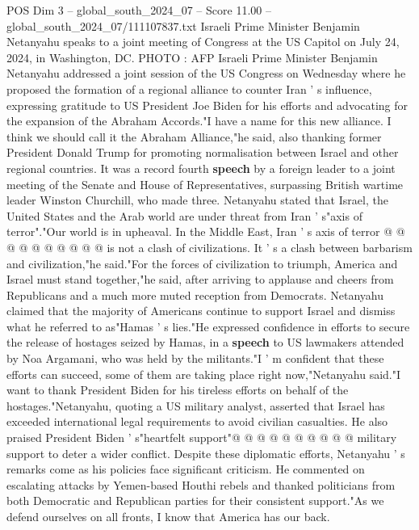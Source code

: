 \begin{textsample}{POS Dim 3 – global\_south\_2024\_07 – Score 11.00 – global\_south\_2024\_07/111107837.txt}  \label{ex:f3_pos_310}
Israeli Prime Minister Benjamin Netanyahu speaks to a joint meeting of Congress at the US Capitol on July 24, 2024, in Washington, DC.
PHOTO : AFP Israeli Prime Minister Benjamin Netanyahu addressed a joint session of the US Congress on Wednesday where he proposed the formation of a regional alliance to counter Iran ' s influence, expressing gratitude to US President Joe Biden for his efforts and advocating for the expansion of the Abraham Accords."I have a name for this new alliance.
I think we should call it the Abraham Alliance,"he said, also thanking former President Donald Trump for promoting normalisation between Israel and other regional countries.
It was a record fourth \textbf{speech} by a foreign leader to a joint meeting of the Senate and House of Representatives, surpassing British wartime leader Winston Churchill, who made three.
Netanyahu stated that Israel, the United States and the Arab world are under threat from Iran ' s"axis of terror"."Our world is in upheaval.
In the Middle East, Iran ' s axis of terror @ @ @ @ @ @ @ @ @ @ is not a clash of civilizations.
It ' s a clash between barbarism and civilization,"he said."For the forces of civilization to triumph, America and Israel must stand together,"he said, after arriving to applause and cheers from Republicans and a much more muted reception from Democrats.
Netanyahu claimed that the majority of Americans continue to support Israel and dismiss what he referred to as"Hamas ' s lies."He expressed confidence in efforts to secure the release of hostages seized by Hamas, in a \textbf{speech} to US lawmakers attended by Noa Argamani, who was held by the militants."I ' m confident that these efforts can succeed, some of them are taking place right now,"Netanyahu said."I want to thank President Biden for his tireless efforts on behalf of the hostages."Netanyahu, quoting a US military analyst, asserted that Israel has exceeded international legal requirements to avoid civilian casualties.
He also praised President Biden ' s"heartfelt support"@ @ @ @ @ @ @ @ @ @ military support to deter a wider conflict.
Despite these diplomatic efforts, Netanyahu ' s remarks come as his policies face significant criticism.
He commented on escalating attacks by Yemen-based Houthi rebels and thanked politicians from both Democratic and Republican parties for their consistent support."As we defend ourselves on all fronts, I know that America has our back.

\end{textsample}
